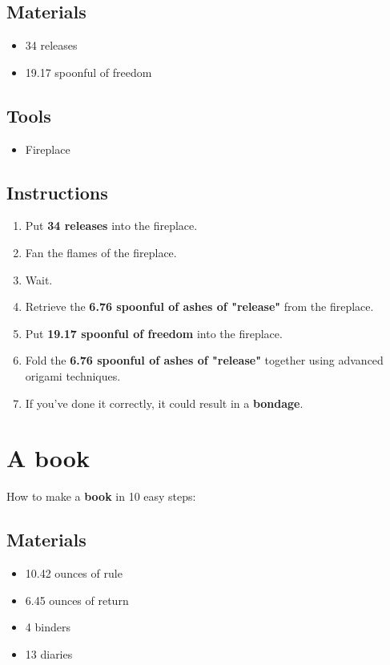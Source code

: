 \documentclass{article}
\begin{document}
\subsection{Materials}\begin{itemize}
\item 
34 releases
\item 
19.17 spoonful of freedom
\end{itemize}
\subsection{Tools}\begin{itemize}
\item 
Fireplace
\end{itemize}
\subsection{Instructions}\begin{enumerate}
\item 
Put \textbf{34 releases} into the fireplace.
\item 
Fan the flames of the fireplace.
\item 
Wait.
\item 
Retrieve the \textbf{6.76 spoonful of ashes of "release"} from the fireplace.
\item 
Put \textbf{19.17 spoonful of freedom} into the fireplace.
\item 
Fold the \textbf{6.76 spoonful of ashes of "release"} together using advanced origami techniques.
\item 
If you've done it correctly, it could result in a \textbf{bondage}.
\end{enumerate}
\newpage
\section{A book}How to make a \textbf{book} in 10 easy steps:

\subsection{Materials}\begin{itemize}
\item 
10.42 ounces of rule
\item 
6.45 ounces of return
\item 
4 binders
\item 
13 diaries
\end{itemize}
\end{document}
